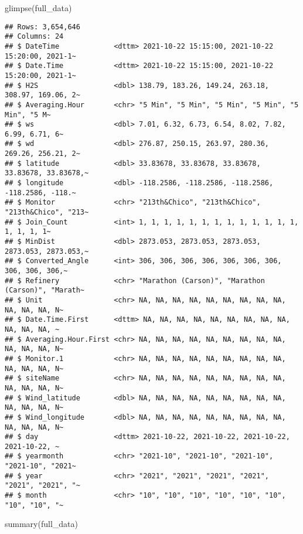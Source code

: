 \documentclass[
]{article}
\newenvironment{Shaded}{\begin{snugshade}}{\end{snugshade}}
\newcommand{\FunctionTok}[1]{\textcolor[rgb]{0.00,0.00,0.00}{#1}}
\newcommand{\NormalTok}[1]{#1}
\begin{document}
\begin{Shaded}
\begin{Highlighting}[]
\FunctionTok{glimpse}\NormalTok{(full\_data)}
\end{Highlighting}
\end{Shaded}

\begin{verbatim}
## Rows: 3,654,646
## Columns: 24
## $ DateTime             <dttm> 2021-10-22 15:15:00, 2021-10-22 15:20:00, 2021-1~
## $ Date.Time            <dttm> 2021-10-22 15:15:00, 2021-10-22 15:20:00, 2021-1~
## $ H2S                  <dbl> 138.79, 183.26, 149.24, 263.18, 308.97, 169.06, 2~
## $ Averaging.Hour       <chr> "5 Min", "5 Min", "5 Min", "5 Min", "5 Min", "5 M~
## $ ws                   <dbl> 7.01, 6.32, 6.73, 6.54, 8.02, 7.82, 6.99, 6.71, 6~
## $ wd                   <dbl> 276.87, 250.15, 263.97, 280.36, 269.26, 256.21, 2~
## $ latitude             <dbl> 33.83678, 33.83678, 33.83678, 33.83678, 33.83678,~
## $ longitude            <dbl> -118.2586, -118.2586, -118.2586, -118.2586, -118.~
## $ Monitor              <chr> "213th&Chico", "213th&Chico", "213th&Chico", "213~
## $ Join_Count           <int> 1, 1, 1, 1, 1, 1, 1, 1, 1, 1, 1, 1, 1, 1, 1, 1, 1~
## $ MinDist              <dbl> 2873.053, 2873.053, 2873.053, 2873.053, 2873.053,~
## $ Converted_Angle      <int> 306, 306, 306, 306, 306, 306, 306, 306, 306, 306,~
## $ Refinery             <chr> "Marathon (Carson)", "Marathon (Carson)", "Marath~
## $ Unit                 <chr> NA, NA, NA, NA, NA, NA, NA, NA, NA, NA, NA, NA, N~
## $ Date.Time.First      <dttm> NA, NA, NA, NA, NA, NA, NA, NA, NA, NA, NA, NA, ~
## $ Averaging.Hour.First <chr> NA, NA, NA, NA, NA, NA, NA, NA, NA, NA, NA, NA, N~
## $ Monitor.1            <chr> NA, NA, NA, NA, NA, NA, NA, NA, NA, NA, NA, NA, N~
## $ siteName             <chr> NA, NA, NA, NA, NA, NA, NA, NA, NA, NA, NA, NA, N~
## $ Wind_latitude        <dbl> NA, NA, NA, NA, NA, NA, NA, NA, NA, NA, NA, NA, N~
## $ Wind_longitude       <dbl> NA, NA, NA, NA, NA, NA, NA, NA, NA, NA, NA, NA, N~
## $ day                  <dttm> 2021-10-22, 2021-10-22, 2021-10-22, 2021-10-22, ~
## $ yearmonth            <chr> "2021-10", "2021-10", "2021-10", "2021-10", "2021~
## $ year                 <chr> "2021", "2021", "2021", "2021", "2021", "2021", "~
## $ month                <chr> "10", "10", "10", "10", "10", "10", "10", "10", "~
\end{verbatim}

\begin{Shaded}
\begin{Highlighting}[]
\FunctionTok{summary}\NormalTok{(full\_data)}
\end{Highlighting}
\end{Shaded}
\end{document}
